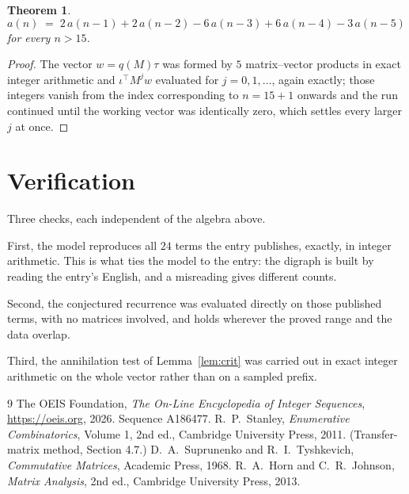 \documentclass[11pt,a4paper]{article}
\theoremstyle{plain}
\newtheorem{theorem}{Theorem}
\theoremstyle{definition}
\begin{document}
\begin{theorem}
\[
a(n)\;=\;2\,a(n-1) + 2\,a(n-2) - 6\,a(n-3) + 6\,a(n-4) - 3\,a(n-5)
\]
for every $n>15$.
\end{theorem}

\begin{proof}
The vector $w=q(M)\tau$ was formed by $5$ matrix--vector products in exact integer
arithmetic and $\iota^{\!\top}M^{j}w$ evaluated for $j=0,1,\dots$, again exactly; those
integers vanish from the index corresponding to $n=15+1$ onwards and the run continued
until the working vector was identically zero, which settles every larger $j$ at once.
\end{proof}

\section{Verification}

Three checks, each independent of the algebra above.

First, the model reproduces all $24$ terms the entry publishes, exactly, in integer
arithmetic. This is what ties the model to the entry: the digraph is built by reading the
entry's English, and a misreading gives different counts.

Second, the conjectured recurrence was evaluated directly on those published terms, with no
matrices involved, and holds wherever the proved range and the data overlap.

Third, the annihilation test of Lemma~\ref{lem:crit} was carried out in exact integer
arithmetic on the whole vector rather than on a sampled prefix.

\begin{thebibliography}{9}
 The OEIS Foundation, \emph{The On-Line Encyclopedia of Integer
Sequences}, \url{https://oeis.org}, 2026. Sequence A186477.
 R.~P.~Stanley, \emph{Enumerative Combinatorics}, Volume 1, 2nd ed.,
Cambridge University Press, 2011. (Transfer-matrix method, Section 4.7.)
 D.~A.~Suprunenko and R.~I.~Tyshkevich, \emph{Commutative Matrices},
Academic Press, 1968.
 R.~A.~Horn and C.~R.~Johnson, \emph{Matrix Analysis}, 2nd ed., Cambridge
University Press, 2013.
\end{thebibliography}
\end{document}
